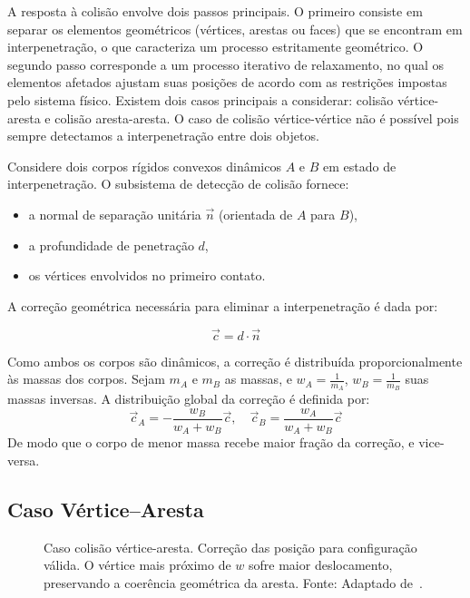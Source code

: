 A resposta à colisão envolve dois passos principais. O primeiro consiste em separar os elementos geométricos (vértices, arestas ou faces) que se encontram em interpenetração, o que caracteriza um processo estritamente geométrico. O segundo passo corresponde a um processo iterativo de relaxamento, no qual os elementos afetados ajustam suas posições de acordo com as restrições impostas pelo sistema físico. Existem dois casos principais a considerar: colisão vértice-aresta e colisão aresta-aresta. O caso de colisão vértice-vértice não é possível pois sempre detectamos a interpenetração entre dois objetos.

Considere dois corpos rígidos convexos dinâmicos $A$ e $B$ em estado de interpenetração. 
O subsistema de detecção de colisão fornece:

\begin{itemize}
    \item a normal de separação unitária $\vec n$ (orientada de $A$ para $B$),
    \item a profundidade de penetração $d$,
    \item os vértices envolvidos no primeiro contato.
\end{itemize}

A correção geométrica necessária para eliminar a interpenetração é dada por:

$$
\vec c = d \cdot \vec n
$$

Como ambos os corpos são dinâmicos, a correção é distribuída proporcionalmente às massas dos corpos. 
Sejam $m_A$ e $m_B$ as massas, e $w_A = \frac{1}{m_A}$, $w_B = \frac{1}{m_B}$ suas massas inversas. 
A distribuição global da correção é definida por:
$$
\vec c_A = - \frac{w_B}{w_A + w_B} \vec c, \quad
\vec c_B = \frac{w_A}{w_A + w_B} \vec c
$$
De modo que o corpo de menor massa recebe maior fração da correção, e vice-versa.

\subsection*{Caso Vértice--Aresta}

\begin{figure}[htb]
	\centering
	
	\caption{Caso colisão vértice-aresta. Correção das posição para configuração válida. O vértice mais próximo de $w$ sofre maior deslocamento, preservando a coerência geométrica da aresta. Fonte: Adaptado de~\cite{jakobsen2001advanced}.}
	\label{fig:processo-separacao}
\end{figure}

